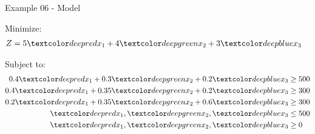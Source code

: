 \begin{frame}{Example 06 - Model}

Minimize:
\begin{align*}
    Z &= 5\colora{x_1} + 4\colorb{x_2} + 3\colorc{x_3}
\end{align*}

Subject to:
\begin{align*}
    0.4\colora{x_1} + 0.3 \colorb{x_2} + 0.2\colorc{x_3} &\ge 500 \\
    0.4\colora{x_1} + 0.35\colorb{x_2} + 0.2\colorc{x_3} &\ge 300 \\
    0.2\colora{x_1} + 0.35\colorb{x_2} + 0.6\colorc{x_3} &\ge 300 \\
       \colora{x_1}, \colorb{x_2}, \colorc{x_3} &\le 500 \\
       \colora{x_1}, \colorb{x_2}, \colorc{x_3} &\ge 0
\end{align*}

\end{frame}
